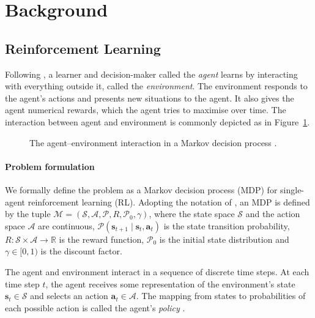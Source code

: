 \section{Background}
\label{sec:background}

\subsection{Reinforcement Learning}

Following \textcite[Sec.~3.1]{sutton2018reinforcement}, a learner and decision-maker called the \textit{agent} learns by interacting with everything outside it, called the \textit{environment}. The environment responds to the agent's actions and presents new situations to the agent. It also gives the agent numerical rewards, which the agent tries to maximise over time. The interaction between agent and environment is commonly depicted as in Figure~\ref{fig:agent-env-loop}.

\begin{figure}[htbp]
    \centering
    
    \caption{The agent--environment interaction in a Markov decision process \parencite[Fig.~3.1]{sutton2018reinforcement}.}
    \label{fig:agent-env-loop}
\end{figure}

\paragraph{Problem formulation}
We formally define the problem as a Markov decision process (MDP) for single-agent reinforcement learning (RL). Adopting the notation of \textcite{song2023reaching}, an MDP is defined by the tuple $\mathcal{M} = (\mathcal{S}, \mathcal{A}, \mathcal{P}, R, \mathcal{P}_0, \gamma)$, where the state space $\mathcal{S}$ and the action space $\mathcal{A}$ are continuous, $\mathcal{P}(\mathbf{s}_{t+1} \mid \mathbf{s}_t, \mathbf{a}_t)$ is the state transition probability, $R : \mathcal{S} \times \mathcal{A} \to \mathbb{R}$ is the reward function, $\mathcal{P}_0$ is the initial state distribution and $\gamma \in [0,1)$ is the discount factor.

The agent and environment interact in a sequence of discrete time steps. At each time step $t$, the agent receives some representation of the environment's state $\mathbf{s}_t \in \mathcal{S}$ and selects an action $\mathbf{a}_t \in \mathcal{A}$. The mapping from states to probabilities of each possible action is called the agent's \textit{policy} \parencite{sutton2018reinforcement}.

